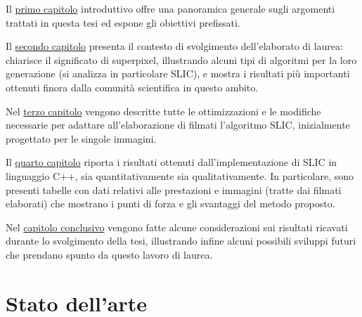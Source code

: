 \documentclass[12pt,a4paper,oneside]{article}
\begin{document}
Il \hyperref[Introduzione]{primo capitolo} introduttivo offre una panoramica generale sugli argomenti trattati in questa tesi ed espone gli obiettivi prefissati.

Il \hyperref[Stato_arte]{secondo capitolo} presenta il contesto di svolgimento dell'elaborato di laurea: chiarisce il significato di superpixel, illustrando alcuni tipi di algoritmi per la loro generazione (si analizza in particolare \acrshort{SLIC}), e mostra i risultati più importanti ottenuti finora dalla comunità scientifica in questo ambito.

Nel \hyperref[Implementazione]{terzo capitolo} vengono descritte tutte le ottimizzazioni e le modifiche necessarie per adattare all'elaborazione di filmati l'algoritmo \acrshort{SLIC}, inizialmente progettato per le singole immagini.

Il \hyperref[Risultati]{quarto capitolo} riporta i risultati ottenuti dall'implementazione di \acrshort{SLIC} in linguaggio \mbox{C++}, sia quantitativamente sia qualitativamente. In particolare, sono presenti tabelle con dati relativi alle prestazioni e immagini (tratte dai filmati elaborati) che mostrano i punti di forza e gli svantaggi del metodo proposto.

Nel \hyperref[Conclusioni]{capitolo conclusivo} vengono fatte alcune considerazioni sui risultati ricavati durante lo svolgimento della tesi, illustrando infine alcuni possibili sviluppi futuri che prendano spunto da questo lavoro di laurea.
\newpage



\section{Stato dell'arte}\label{Stato_arte}
\end{document}
